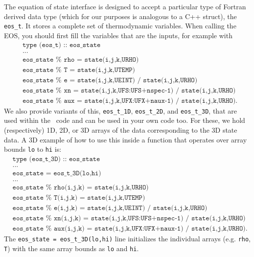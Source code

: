 The equation of state interface is designed to accept a particular
type of Fortran derived data type (which for our purposes is analogous
to a C++ struct), the {\tt eos\_t}. It stores a complete set of thermodynamic
variables. When calling the EOS, you should first fill the variables
that are the inputs, for example with
\begin{align*}
  &\texttt{type (eos\_t) :: eos\_state} \\
  &\texttt{...} \\
  &\texttt{eos\_state } \% \texttt{ rho = state(i,j,k,URHO)} \\
  &\texttt{eos\_state } \% \texttt{ T   = state(i,j,k,UTEMP)} \\
  &\texttt{eos\_state } \% \texttt{ e   = state(i,j,k,UEINT) / state(i,j,k,URHO)} \\
  &\texttt{eos\_state } \% \texttt{ xn  = state(i,j,k,UFS:UFS+nspec-1) / state(i,j,k,URHO)} \\
  &\texttt{eos\_state } \% \texttt{ aux = state(i,j,k,UFX:UFX+naux-1) / state(i,j,k,URHO)}.
\end{align*}
We also provide variants of this, {\tt eos\_t\_1D}, {\tt eos\_t\_2D}, and {\tt eos\_t\_3D},
that are used within the \castro\ code and can be used in your own code too. For these,
we hold (respectively) 1D, 2D, or 3D arrays of the data corresponding to the 3D state data.
A 3D example of how to use this inside a function that operates over array bounds {\tt lo} to
{\tt hi} is:
\begin{align*}
  &\texttt{type (eos\_t\_3D) :: eos\_state} \\
  &\texttt{...} \\
  &\texttt{eos\_state = eos\_t\_3D(lo,hi)} \\
  &\texttt{...} \\
  &\texttt{eos\_state } \% \texttt{ rho(i,j,k) = state(i,j,k,URHO)} \\
  &\texttt{eos\_state } \% \texttt{ T(i,j,k)   = state(i,j,k,UTEMP)} \\
  &\texttt{eos\_state } \% \texttt{ e(i,j,k)   = state(i,j,k,UEINT) / state(i,j,k,URHO)} \\
  &\texttt{eos\_state } \% \texttt{ xn(i,j,k)  = state(i,j,k,UFS:UFS+nspec-1) / state(i,j,k,URHO)} \\
  &\texttt{eos\_state } \% \texttt{ aux(i,j,k) = state(i,j,k,UFX:UFX+naux-1) / state(i,j,k,URHO)}.
\end{align*}
The \texttt{eos\_state = eos\_t\_3D(lo,hi)} line initializes the individual arrays (e.g. {\tt rho}, {\tt T})
with the same array bounds as {\tt lo} and {\tt hi}.

